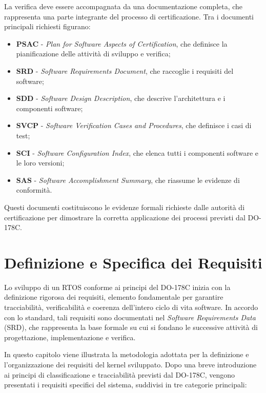 \documentclass[italian, Lau, oneside]{sapthesis} %
\begin{document}
La verifica deve essere accompagnata da una documentazione completa, che rappresenta una parte integrante del processo di certificazione.  
Tra i documenti principali richiesti figurano:
\begin{itemize}
    \item \textbf{PSAC} - \emph{Plan for Software Aspects of Certification}, che definisce la pianificazione delle attività di sviluppo e verifica;
    \item \textbf{SRD} - \emph{Software Requirements Document}, che raccoglie i requisiti del software;
    \item \textbf{SDD} - \emph{Software Design Description}, che descrive l’architettura e i componenti software;
    \item \textbf{SVCP} - \emph{Software Verification Cases and Procedures}, che definisce i casi di test;
    \item \textbf{SCI} - \emph{Software Configuration Index}, che elenca tutti i componenti software e le loro versioni;
    \item \textbf{SAS} - \emph{Software Accomplishment Summary}, che riassume le evidenze di conformità.
\end{itemize}

Questi documenti costituiscono le evidenze formali richieste dalle autorità di certificazione per dimostrare la corretta applicazione dei processi previsti dal DO-178C.

\chapter*{Definizione e Specifica dei Requisiti}
\label{cap:2}

Lo sviluppo di un RTOS conforme ai principi del DO-178C inizia con la definizione rigorosa dei requisiti, elemento fondamentale per garantire tracciabilità, verificabilità e coerenza dell’intero ciclo di vita software.  
In accordo con lo standard, tali requisiti sono documentati nel \emph{Software Requirements Data} (SRD), che rappresenta la base formale su cui si fondano le successive attività di progettazione, implementazione e verifica.

In questo capitolo viene illustrata la metodologia adottata per la definizione e l’organizzazione dei requisiti del kernel sviluppato.  
Dopo una breve introduzione ai principi di classificazione e tracciabilità previsti dal DO-178C, vengono presentati i requisiti specifici del sistema, suddivisi in tre categorie principali:
 
\end{document}
